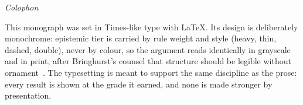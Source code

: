 \documentclass{ftdmonograph}
\begin{document}
\clearpage
\thispagestyle{empty}
\vspace*{\fill}
\begin{center}\small\itshape
Colophon
\end{center}
\begin{center}\footnotesize
This monograph was set in Times-like type with \LaTeX. Its design is
deliberately monochrome: epistemic tier is carried by rule weight and style
(heavy, thin, dashed, double), never by colour, so the argument reads
identically in grayscale and in print, after Bringhurst's counsel that structure
should be legible without ornament~\cite{bringhurst2004}. The typesetting is
meant to support the same discipline as the prose: every result is shown at the
grade it earned, and none is made stronger by presentation.
\end{center}
\vspace*{\fill}
\end{document}
